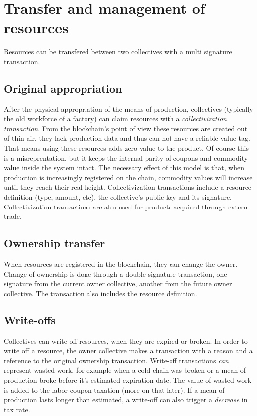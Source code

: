 \documentclass[11pt]{article}
\begin{document}
\section{Transfer and management of resources}

Resources can be transfered between two collectives with a multi signature transaction. 

\subsection{Original appropriation}

After the physical appropriation of the means of production, collectives (typically the old workforce of a factory) can claim resources with a \emph{collectivization transaction}. From the blockchain's point of view these resources are created out of thin air, they lack production data and thus can not have a reliable value tag. That means using these resources adds zero value to the product. Of course this is a misreprentation, but it keeps the internal parity of coupons and commodity value inside the system intact. The necessary effect of this model is that, when production is increasingly registered on the chain, commodity values will increase until they reach their real height.
Collectivization transactions include a resource definition (type, amount, etc), the collective's public key and its signature. Collectivization transactions are also used for products acquired through extern trade. 

\subsection{Ownership transfer}

When resources are registered in the blockchain, they can change the owner. Change of ownership is done through a double signature transaction, one signature from the current owner collective, another from the future owner collective. The transaction also includes the resource definition.

\subsection{Write-offs}

Collectives can write off resources, when they are expired or broken. In order to write off a resource, the owner collective makes a transaction with a reason and a reference to the original ownership transaction. Write-off transactions \emph{can} represent wasted work, for example when a cold chain was broken or a mean of production broke before it's estimated expiration date. The value of wasted work is added to the labor coupon taxation (more on that later). If a mean of production lasts longer than estimated, a write-off can also trigger a \emph{decrease} in tax rate.
\end{document}
